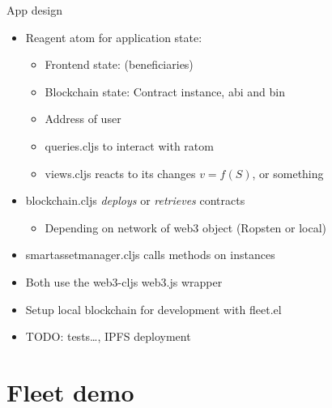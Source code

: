 \documentclass[presentation]{beamer}
\begin{document}
\begin{frame}[label=sec-3-8]{App design}
\begin{itemize}
\item Reagent atom for \alert{application state}:
\begin{itemize}
\item Frontend state: (beneficiaries)
\item Blockchain state: Contract instance, abi and bin
\item Address of user
\item \alert{queries.cljs} to interact with ratom
\item \alert{views.cljs} reacts to its changes $v=f(S)$, or something
\end{itemize}

\item \alert{blockchain.cljs} \emph{deploys} or \emph{retrieves} contracts
\begin{itemize}
\item Depending on network of web3 object (Ropsten or local)
\end{itemize}
\item \alert{smart\textunderscore{}asset\textunderscore{}manager.cljs} calls methods on instances
\item Both use the \alert{web3-cljs} web3.js wrapper

\item Setup local blockchain for development with \alert{fleet.el}
\item TODO: \alert{tests}\ldots{}, \alert{IPFS} deployment
\end{itemize}
\end{frame}

\section{Fleet demo}
\label{sec-4}
\end{document}
